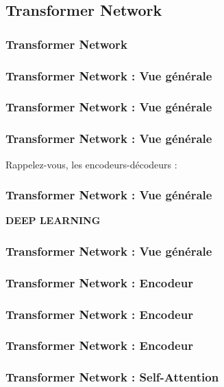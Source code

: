 \subsection{Transformer Network}



\begin{frame}
  \frametitle{Transformer Network}
\end{frame}

\begin{frame}
  \frametitle{Transformer Network : Vue générale}
\end{frame}

\begin{frame}
  \frametitle{Transformer Network : Vue générale}
\end{frame}

\begin{frame}
  \frametitle{Transformer Network : Vue générale}
  Rappelez-vous, les encodeurs-décodeurs :
\end{frame}

\begin{frame}
  \frametitle{Transformer Network : Vue générale}
  \textbf{DEEP LEARNING}
\end{frame}

\begin{frame}
  \frametitle{Transformer Network : Vue générale}
\end{frame}

\begin{frame}
  \frametitle{Transformer Network : Encodeur}
\end{frame}

\begin{frame}
  \frametitle{Transformer Network : Encodeur}
\end{frame}

\begin{frame}
  \frametitle{Transformer Network : Encodeur}
\end{frame}

\begin{frame}
  \frametitle{Transformer Network : Self-Attention}
\end{frame}

